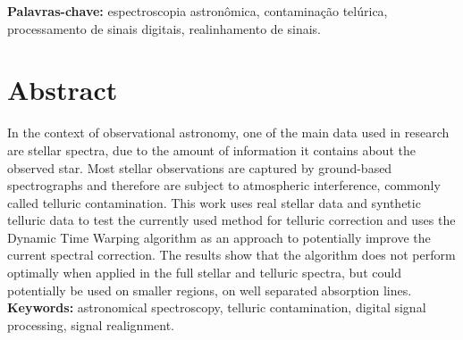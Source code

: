\documentclass[12pt,twoside,a4paper]{book}
\begin{document}
\noindent \textbf{Palavras-chave:} espectroscopia astronômica, contaminação telúrica, processamento de sinais digitais, realinhamento de sinais.

\chapter*{Abstract}

In the context of observational astronomy, one of the main data used in research are stellar spectra, due to the  amount of information it contains about the observed star. Most stellar observations are captured by ground-based spectrographs and therefore are subject to atmospheric interference, commonly called telluric contamination. This work uses real stellar data and synthetic telluric data to test the currently used method for telluric correction and uses the Dynamic Time Warping algorithm as an approach to potentially improve the current spectral correction. The results show that the algorithm does not perform optimally when applied in the full stellar and telluric spectra, but could potentially be used on smaller regions, on well separated absorption lines.  
\\

\noindent \textbf{Keywords:} astronomical spectroscopy, telluric contamination, digital signal processing, signal realignment.


\tableofcontents    %




\end{document}
